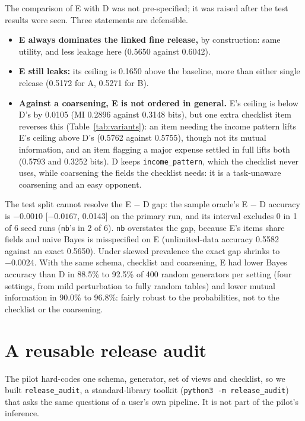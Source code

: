 \documentclass[11pt]{article}
\newcommand{\code}[1]{\texttt{#1}}
\begin{document}
The comparison of E with D was not pre-specified; it was raised after the test results were seen. Three statements are defensible.
\begin{itemize}
  \item \textbf{E always dominates the linked fine release,} by construction: same utility, and less leakage here (0.5650 against 0.6042).
  \item \textbf{E still leaks:} its ceiling is 0.1650 above the baseline, more than either single release (0.5172 for A, 0.5271 for B).
  \item \textbf{Against a coarsening, E is not ordered in general.} E's ceiling is below D's by 0.0105 (MI 0.2896 against 0.3148 bits), but one extra checklist item reverses this (Table~\ref{tab:variants}): an item needing the income pattern lifts E's ceiling above D's (0.5762 against 0.5755), though not its mutual information, and an item flagging a major expense settled in full lifts both (0.5793 and 0.3252 bits). D keeps \code{income\_pattern}, which the checklist never uses, while coarsening the fields the checklist needs: it is a task-unaware coarsening and an easy opponent.
\end{itemize}
The test split cannot resolve the E $-$ D gap: the sample oracle's E $-$ D accuracy is $-0.0010$ [$-0.0167$, 0.0143] on the primary run, and its interval excludes 0 in 1 of 6 seed runs (\code{nb}'s in 2 of 6). \code{nb} overstates the gap, because E's items share fields and naive Bayes is misspecified on E (unlimited-data accuracy 0.5582 against an exact 0.5650). Under skewed prevalence the exact gap shrinks to $-0.0024$. With the same schema, checklist and coarsening, E had lower Bayes accuracy than D in 88.5\% to 92.5\% of 400 random generators per setting (four settings, from mild perturbation to fully random tables) and lower mutual information in 90.0\% to 96.8\%: fairly robust to the probabilities, not to the checklist or the coarsening.

\section{A reusable release audit}
\label{sec:toolkit}

The pilot hard-codes one schema, generator, set of views and checklist, so we built \code{release\_audit}, a standard-library toolkit (\code{python3 -m release\_audit}) that asks the same questions of a user's own pipeline. It is not part of the pilot's inference.
\end{document}
